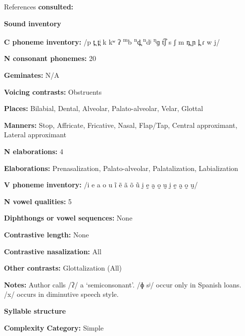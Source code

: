References \textbf{consulted:} \citet{Bradley1971,Costello2014}



\textbf{Sound inventory}



\textbf{C phoneme inventory:} /p t̪ t̪ʲ k kʷ ʔ \textsuperscript{m}b \textsuperscript{n}d̪ \textsuperscript{n}dʲ \textsuperscript{ŋ}ɡ t͡ʃ s ʃ m n̪ ɲ l̪ ɾ w j/



\textbf{N consonant phonemes:} 20



\textbf{Geminates:} N/A



\textbf{Voicing contrasts:} Obstruents



\textbf{Places:} Bilabial, Dental, Alveolar, Palato-alveolar, Velar, Glottal



\textbf{Manners:} Stop, Affricate, Fricative, Nasal, Flap/Tap, Central approximant, Lateral approximant



\textbf{N elaborations:} 4



\textbf{Elaborations:} Prenasalization, Palato-alveolar, Palatalization, Labialization



\textbf{V phoneme inventory:} /i e a o u ĩ ẽ ã õ ũ ḭ ḛ a̰ o̰ ṵ ḭ ḛ a̰ o̰ ṵ/



\textbf{N vowel qualities:} 5



\textbf{Diphthongs or vowel sequences:} None



\textbf{Contrastive length:} None



\textbf{Contrastive nasalization:} All



\textbf{Other contrasts:} Glottalization (All)



\textbf{Notes:} Author calls /ʔ/ a ‘semiconsonant’. /ɸ sʲ/ occur only in Spanish loans. /x/ occurs in diminutive speech style.



\textbf{Syllable structure}



\textbf{Complexity Category:} Simple



